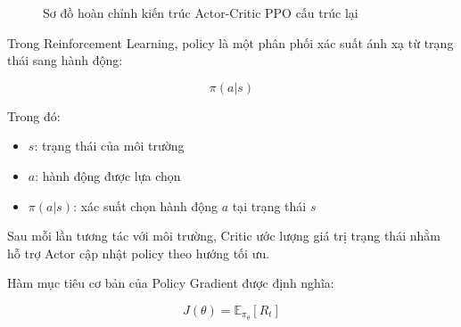 \begin{figure}[!htbp]
\caption{Sơ đồ hoàn chỉnh kiến trúc Actor-Critic PPO cấu trúc lại}
\label{fig:actor_critic_ppo_perfect}
\end{figure}


Trong Reinforcement Learning, policy là một phân phối xác suất ánh xạ từ trạng thái sang hành động:


\[
\pi(a|s)
\]

Trong đó:
\begin{itemize}
    \item $s$: trạng thái của môi trường
    \item $a$: hành động được lựa chọn
    \item $\pi(a|s)$: xác suất chọn hành động $a$ tại trạng thái $s$
\end{itemize}

Sau mỗi lần tương tác với môi trường, Critic ước lượng giá trị trạng thái nhằm hỗ trợ Actor cập nhật policy theo hướng tối ưu.

Hàm mục tiêu cơ bản của Policy Gradient được định nghĩa:

\[
J(\theta) = \mathbb{E}_{\pi_\theta}[R_t]
\]

